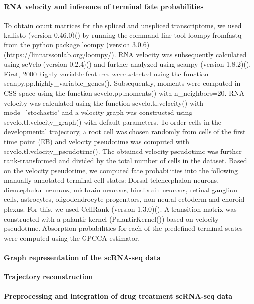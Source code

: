 \paragraph{RNA velocity and inference of terminal fate probabilities}
To obtain count matrices for the spliced and unspliced transcriptome, we used kallisto (version 0.46.0)(\cite{bray_near-optimal_2016}) by running the command line tool loompy fromfastq  from the python package loompy (version 3.0.6)(https://linnarssonlab.org/loompy/). RNA velocity was subsequently calculated using scVelo (version 0.2.4)(\cite{bergen_generalizing_2020}) and further analyzed using scanpy (version 1.8.2)(\cite{wolf_scanpy_2018}). First, 2000 highly variable features were selected using the function scanpy.pp.highly\_variable\_genes(). Subsequently, moments were computed in CSS space using the function scvelo.pp.moments() with n\_neighbors=20. RNA velocity was calculated using the function scvelo.tl.velocity() with mode='stochastic' and a velocity graph was constructed using scvelo.tl.velocity\_graph() with default parameters. To order cells in the developmental trajectory, a root cell was chosen randomly from cells of the first time point (EB) and velocity pseudotime was computed with scvelo.tl.velocity\_pseudotime().  The obtained velocity pseudotime was further rank-transformed and divided by the total number of cells in the dataset. Based on the velocity pseudotime, we computed fate probabilities into the following manually annotated terminal cell states: Dorsal telencephalon neurons, diencephalon neurons, midbrain neurons, hindbrain neurons, retinal ganglion cells, astrocytes, oligodendrocyte progenitors, non-neural ectoderm and choroid plexus. For this, we used CellRank (version 1.3.0)(\cite{lange_cellrank_2022}). A transition matrix was constructed with a palantir kernel (PalantirKernel()) based on velocity pseudotime. Absorption probabilities for each of the predefined terminal states were computed using the GPCCA estimator.


\paragraph{Graph representation of the scRNA-seq data}

\paragraph{Trajectory reconstruction}

\paragraph{Preprocessing and integration of drug treatment scRNA-seq data}

